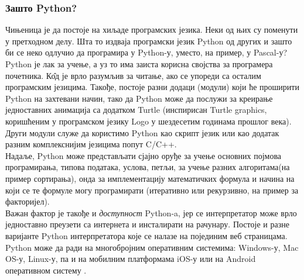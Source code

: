 \documentclass[11pt, serbianc, english, titlepage]{article}
\begin{document}
		\subsubsection{Зашто Python?}
		Чињеница је да постоје на хиљаде програмских језика. Неки од њих су поменути у претходном делу. Шта то издваја програмски језик Python од других и зашто би се неко одлучио да програмира у Python-у, уместо, на пример, у Pascal-у?\\
		Python је лак за учење, а уз то има заиста корисна својства за програмера почетника. К\^{о}д је врло разумљив за читање, ако се упореди са осталим програмским језицима. Такође, постоје разни додаци (модули) који ће проширити Python на захтевани начин, тако да Python може да послужи за креирање једноставних анимација са додатком Turtle (инспирисан Turtle graphics, коришћеним у програмском језику Logo у шездесетим годинама прошлог века)\cite{briggs2012python}. Други модули служе да користимо Python као скрипт језик или као додатак разним комплекснијим језицима попут  C/C++. \\
		Надаље, Python може представљати сјајно оруђе за учење основних појмова програмирања, типова података, услова, петљи, за учење разних алгоритама(на пример сортирања), онда за имплементацију математичких формула и начина на који се те формуле могу програмирати (итеративно или рекурзивно, на пример за факторијел).\\
		Важан фактор је такође и \emph{доступност} Python-a, јер се интерпретатор може врло једноставно преузети са интернета и инсталирати на рачунару. Постоје и разне варијанте Python интерпретатора које се налазе на појединим веб страницама. Python може да ради на многобројним оперативним системима: Windows-у, Mac OS-у, Linux-у, па и на мобилним платформама iOS-у или на Android оперативном систему\cite{pythonsite} . 
\end{document}
